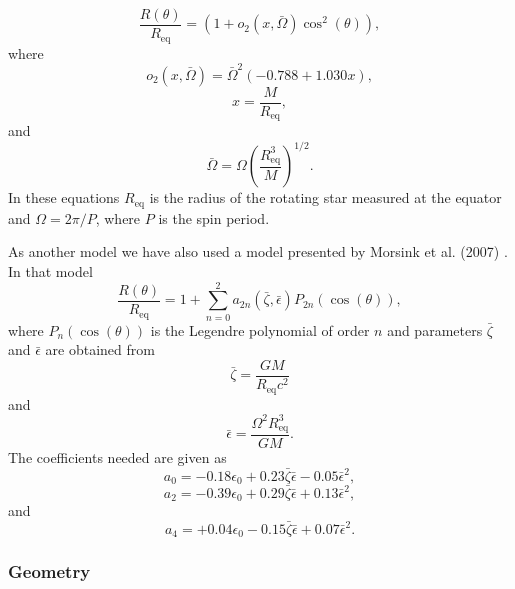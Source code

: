 \documentclass{wihuri}
\def\be{\begin{equation}}
\def\ee{\end{equation}}
\begin{document}
\begin{equation}
\label{rtheta2}
\frac{R(\theta)}{R_{\mathrm{eq}}} = (1 + o_{2}(x,\bar{\Omega})\cos^{2}(\theta)),
\end{equation}
where
\begin{equation}
\label{otwo}
o_{2}(x,\bar{\Omega}) = \bar{\Omega}^{2}(-0.788+1.030x),
\end{equation}
\begin{equation}
\label{rtheta2x}
x = \frac{M}{R_{\mathrm{eq}}},
\end{equation}
and
\begin{equation}
\label{rtheta2omega}
\bar{\Omega} = \Omega \left(\frac{R_{\mathrm{eq}}^{3}}{M} \right)^{1/2}.
\end{equation}
In these equations $R_{\mathrm{eq}}$ is the radius of the rotating star measured at the equator and $\Omega = 2\pi/P$, where $P$ is the spin period. %

As another model %
we have also used a model presented by Morsink et al. (2007) \cite{morsink}. In that model
\be\label{eq:rtheta}
\frac{R(\theta)}{R_{\mathrm{eq}}} = 1 + \sum\limits_{n=0}^2 a_{2n}(\bar{\zeta},\bar{\epsilon})P_{2n}(\cos(\theta)), 
\ee
where $P_{n}(\cos(\theta))$ is the Legendre polynomial of order $n$ and parameters $\bar{\zeta}$ and $\bar{\epsilon}$ are obtained from
\be\label{eq:parzeta}
\bar{\zeta} = \frac{GM}{R_{\mathrm{eq}}c^{2}}
\ee
and
\be\label{eq:parepsilon}
\bar{\epsilon} = \frac{\Omega^{2}R_{\mathrm{eq}}^{3}}{GM}.
\ee
The coefficients needed are given as
\be\label{eq:azero}
a_{0} = -0.18\epsilon_{0}+0.23\bar{\zeta}\bar{\epsilon}-0.05\bar{\epsilon}^{2}, 
\ee
\be\label{eq:atwo}
a_{2} = -0.39\epsilon_{0}+0.29\bar{\zeta}\bar{\epsilon}+0.13\bar{\epsilon}^{2},
\ee
and
\be\label{eq:afour}
a_{4} = +0.04\epsilon_{0}-0.15\bar{\zeta}\bar{\epsilon}+0.07\bar{\epsilon}^{2}.
\ee


\subsubsection{Geometry}
\end{document}

